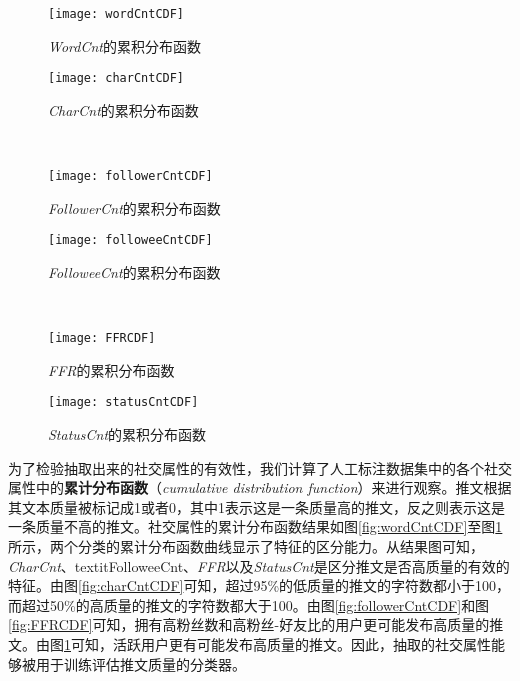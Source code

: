 \begin{figure}[!htbp]
   \begin{minipage}{0.48\textwidth}
     \centering
     \texttt{[image: wordCntCDF]}
     \caption{\textit{WordCnt}的累积分布函数}
     \label{fig:wordCntCDF}
   \end{minipage}
   \hfill
   \begin {minipage}{0.48\textwidth}
     \centering
     \texttt{[image: charCntCDF]}
     \caption{\textit{CharCnt}的累积分布函数}
     \label{fig:charCntCDF}
   \end{minipage}
   \\
   \begin{minipage}{0.48\textwidth}
     \centering
     \texttt{[image: followerCntCDF]}
     \caption{\textit{FollowerCnt}的累积分布函数}
     \label{fig:followerCntCDF}
   \end{minipage}
   \hfill
   \begin {minipage}{0.48\textwidth}
     \centering
     \texttt{[image: followeeCntCDF]}
     \caption{\textit{FolloweeCnt}的累积分布函数}
     \label{fig:followeeCntCDF}
   \end{minipage}
   \\
   \begin{minipage}{0.48\textwidth}
     \centering
     \texttt{[image: FFRCDF]}
     \caption{\textit{FFR}的累积分布函数}
     \label{fig:FFRCDF}
   \end{minipage}
   \hfill
   \begin {minipage}{0.48\textwidth}
     \centering
     \texttt{[image: statusCntCDF]}
     \caption{\textit{StatusCnt}的累积分布函数}
     \label{fig:StatusCnt}
   \end{minipage}
\end{figure}

为了检验抽取出来的社交属性的有效性，我们计算了人工标注数据集中的各个社交属性中的\textbf{累计分布函数}（\textit{cumulative distribution function}）来进行观察。推文根据其文本质量被标记成1或者0，其中1表示这是一条质量高的推文，反之则表示这是一条质量不高的推文。社交属性的累计分布函数结果如图\ref{fig:wordCntCDF}至图\ref{fig:StatusCnt}所示，两个分类的累计分布函数曲线显示了特征的区分能力。从结果图可知，\textit{CharCnt}、textit{FolloweeCnt}、\textit{FFR}以及\textit{StatusCnt}是区分推文是否高质量的有效的特征。由图\ref{fig:charCntCDF}可知，超过95\%的低质量的推文的字符数都小于100，而超过50\%的高质量的推文的字符数都大于100。由图\ref{fig:followerCntCDF}和图\ref{fig:FFRCDF}可知，拥有高粉丝数和高粉丝-好友比的用户更可能发布高质量的推文。由图\ref{fig:StatusCnt}可知，活跃用户更有可能发布高质量的推文。因此，抽取的社交属性能够被用于训练评估推文质量的分类器。

